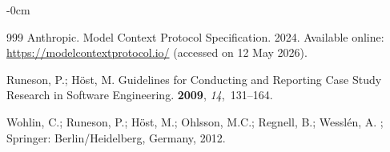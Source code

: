 \documentclass[software,article,accept,pdftex,oneauthor]{Definitions/mdpi}
\def\hl#1{#1}
\begin{document}
\begin{adjustwidth}{-\extralength}{0cm}
\begin{thebibliography}{999}
\hl{Anthropic.} %
\newblock Model Context Protocol Specification.  2024.
\newblock Available online: \url{https://modelcontextprotocol.io/} (accessed on 12 May 2026).

\newpage
{}
Runeson, P.; H\"{o}st, M.
\newblock Guidelines for Conducting and Reporting Case Study Research in
  Software Engineering.
 {\bf 2009}, {\em 14},~131--164.

Wohlin, C.; Runeson, P.; H\"{o}st, M.; Ohlsson, M.C.; Regnell, B.; Wessl\'{e}n,
  A.
; Springer: Berlin/Heidelberg,
  Germany,  2012.

\end{thebibliography}
\PublishersNote{}
\end{adjustwidth}
\end{document}
